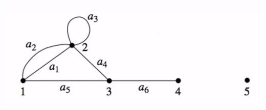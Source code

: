 \documentclass[12pt, letterpaper]{article}
\begin{document}
\begin{minipage}[t]{0.35\linewidth}
    \centering
    \strut\vspace*{4\baselineskip}\newline\includegraphics[width=\linewidth]{graphex1.png} \smallbreak
\end{minipage}
\end{document}
